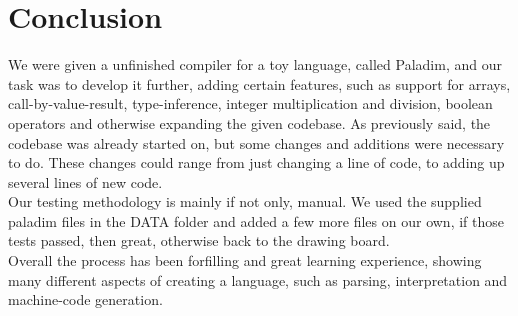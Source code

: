 \section{Conclusion}
We were given a unfinished compiler for a toy language, called Paladim, and our task was to
develop it further, adding certain features, such as support for arrays,
call-by-value-result, type-inference, integer multiplication and division,
boolean operators and otherwise expanding the given codebase. As previously said,
the codebase was already started on, but some changes and additions were
necessary to do.
These changes could range from just changing a line of code, to adding up
several lines of new code.\\
Our testing methodology is mainly if not only, manual. We used the supplied
paladim files in the DATA folder and added a few more files on our own, if those
tests passed, then great, otherwise back to the drawing board.\\
Overall the process has been forfilling and great learning experience, showing
many different aspects of creating a language, such as parsing, interpretation
and machine-code generation.\\

